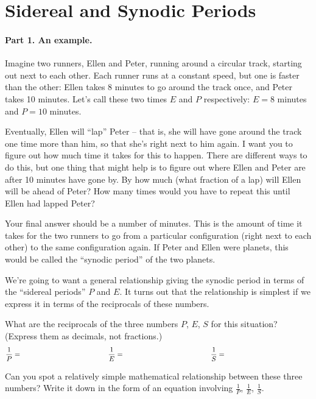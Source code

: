 \section{Sidereal and Synodic Periods}

\makelabheader

\medskip

\paragraph{Part 1. An example.}
Imagine two runners, Ellen and Peter,
running around a circular track, starting out
next to each other. Each runner runs at a constant speed, but one 
is faster than the other: Ellen takes 8 minutes to go around the track
once, and Peter takes 10 minutes. Let's call these two times
$E$ and $P$ respectively: $E=8$ minutes and $P=10$ minutes.


Eventually, Ellen will ``lap'' Peter -- that is, she will have gone around
the track one time more than him, so that she's right
next to him again. I want
you to figure out how much time it takes for this to happen.
There are different ways to do this, but one thing that might help
is to figure out where Ellen and Peter are after 10 minutes have gone by.
By how much (what fraction of a lap) will Ellen will be ahead of 
Peter? How many times would you have to repeat this until Ellen
had lapped Peter?

Your final answer should be a number of minutes. This is the amount
of time it takes for the two runners to go from a particular configuration
(right next to each other) to the same configuration again. If Peter and Ellen
were planets, this would be called the ``synodic period'' of the two planets.

\answerspace{2in}


We're going to want a general relationship giving the synodic period
in terms of the ``sidereal periods'' $P$ and $E$. It turns
out that the relationship is simplest if we express it in terms
of the reciprocals of these numbers.

What are the reciprocals of the three numbers $P$, $E$, $S$ for
this situation? (Express them as decimals, not fractions.)
$$
\frac{1}{P}=
\hspace{1.7in}
\frac{1}{E}=
\hspace{1.7in}
\frac{1}{S}=
\hspace{ 1.7in}
$$

Can you spot a relatively simple mathematical relationship
between these three numbers? Write it down in the form of an equation
involving $\frac{1}{P}$, $\frac{1}{E}$, $\frac{1}{S}$.


